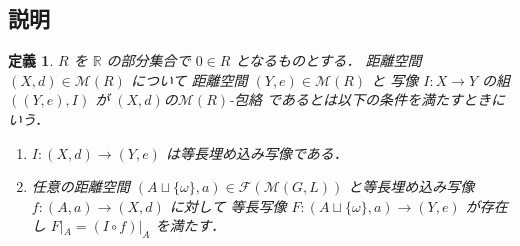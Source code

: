 \documentclass[leqno, 12pt]{jsarticle}
\newtheorem{df}[thm]{定義}
\newcommand{\rr}{\mathbb{R}}
\begin{document}
\subsection{説明}

\begin{df}\label{df:func:envelope}
$R$
を
$\rr$
の部分集合で
$0\in R$
となるものとする．
距離空間
$(X, d)\in \mathscr{M}(R)$
について
距離空間
$(Y, e)\in \mathscr{M}(R)$
と
写像
$I\colon  X\to Y$
の組
$((Y, e), I)$
が
$(X, d)$の$\mathscr{M}(R)$-包絡
であるとは以下の条件を満たすときにいう．
\begin{enumerate}
\item 
$I\colon  (X, d)\to (Y, e)$
は等長埋め込み写像である．
\item 
任意の距離空間
$(A\sqcup \{\omega\}, a)\in \mathscr{F}(\mathscr{M}(G, L))$
と等長埋め込み写像
$f\colon  (A, a)\to (X, d)$
に対して
等長写像
$F\colon  (A\sqcup \{\omega\}, a)\to (Y, e)$
が存在し
$F|_A=(I\circ f)|_{A}$
を満たす．
\end{enumerate}
\end{df}
\end{document}
